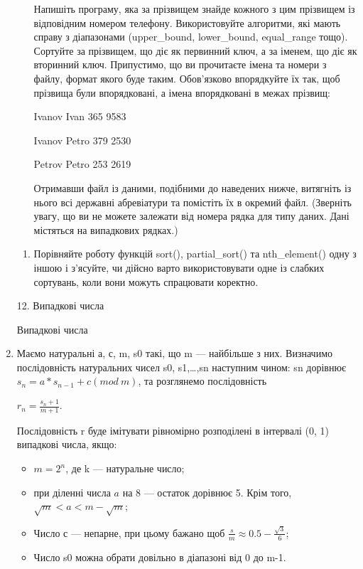 \documentclass[]{article}
\begin{document}
\begin{enumerate}
\begin{itemize}
  Напишіть програму, яка за прізвищем знайде кожного з цим прізвищем із
  відповідним номером телефону. Використовуйте алгоритми, які мають
  справу з діапазонами (upper\_bound, lower\_bound, equal\_range тощо).
  Сортуйте за прізвищем, що діє як первинний ключ, а за іменем, що діє
  як вторинний ключ. Припустимо, що ви прочитаєте імена та номери з
  файлу, формат якого буде таким. Обов'язково впорядкуйте їх так, щоб
  прізвища були впорядковані, а імена впорядковані в межах прізвищ:

  Ivanov Ivan 365 9583

  Ivanov Petro 379 2530

  Petrov Petro 253 2619

  Отримавши файл із даними, подібними до наведених нижче, витягніть із
  нього всі державні абревіатури та помістіть їх в окремий файл.
  (Зверніть увагу, що ви не можете залежати від номера рядка для типу
  даних. Дані містяться на випадкових рядках.)
\end{itemize}

\begin{enumerate}
\def\labelenumi{\arabic{enumi}.}
\item
  Порівняйте роботу функцій sort(), partial\_sort() та nth\_element()
  одну з іншою і з'ясуйте, чи дійсно варто використовувати одне із
  слабких сортувань, коли вони можуть спрацювати коректно.
\end{enumerate}


12. Випадкові числа

Випадкові числа


\def\labelenumi{\arabic{enumi}.}
\item

Маємо натуральні а, с, m, s0 такі, що m --- найбільше з них. Визначимо
послідовність натуральних чисел s0, s1,\ldots{},sn наступним чином: sn
дорівнює \(s_{n} = a*s_{n - 1} + c(mod\ m)\), та розглянемо
послідовність

\(r_{n} = \frac{s_{n} + 1}{m + 1}\).

Послідовність r буде імітувати рівномірно розподілені в інтервалі (0, 1)
випадкові числа, якщо:
\begin{itemize}
\item
 \({m = 2}^{n}\), де k --- натуральне число;
\item
 при діленні числа \(a\) на 8 --- остаток дорівнює 5. Крім того,
\(\sqrt{m} < a < m - \sqrt{m}\);
\item
 Число с --- непарне, при цьому бажано щоб
\(\frac{s}{m} \approx 0.5 - \frac{\sqrt{3}}{6}\);
\item
 Число s0 можна обрати довільно в діапазоні від 0 до m-1.
\end{itemize}


\end{enumerate}
\end{document}
